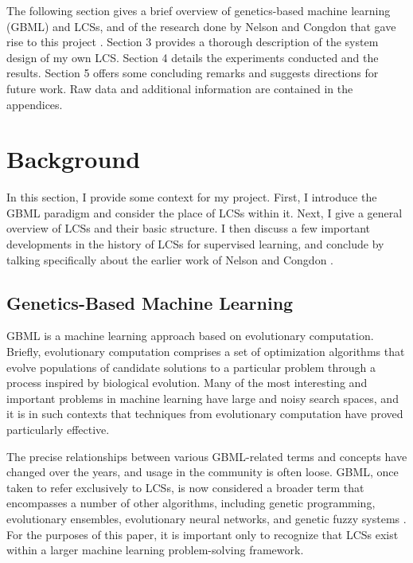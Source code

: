 \documentclass[12pt,twoside]{article}
\begin{document}
The following section gives a brief overview of genetics-based machine learning (GBML) and LCSs, and of the research done by Nelson and Congdon that gave rise to this project \cite{nelson_measuring_2016}. Section 3 provides a thorough description of the system design of my own LCS. Section 4 details the experiments conducted and the results. Section 5 offers some concluding remarks and suggests directions for future work. Raw data and additional information are contained in the appendices.

\section{Background}

In this section, I provide some context for my project. First, I introduce the GBML paradigm and consider the place of LCSs within it. Next, I give a general overview of LCSs and their basic structure. I then discuss a few important developments in the history of LCSs for supervised learning, and conclude by talking specifically about the earlier work of Nelson and Congdon \cite{nelson_measuring_2016}.

\subsection{Genetics-Based Machine Learning}

GBML is a machine learning approach based on evolutionary computation. Briefly, evolutionary computation comprises a set of optimization algorithms that evolve populations of candidate solutions to a particular problem through a process inspired by biological evolution. Many of the most interesting and important problems in machine learning have large and noisy search spaces, and it is in such contexts that techniques from evolutionary computation have proved particularly effective.

The precise relationships between various GBML-related terms and concepts have changed over the years, and usage in the community is often loose. GBML, once taken to refer exclusively to LCSs, is now considered a broader term that encompasses a number of other algorithms, including genetic programming, evolutionary ensembles, evolutionary neural networks, and genetic fuzzy systems \cite{kovacs_genetics-based_2012}. For the purposes of this paper, it is important only to recognize that LCSs exist within a larger machine learning problem-solving framework.
\end{document}
